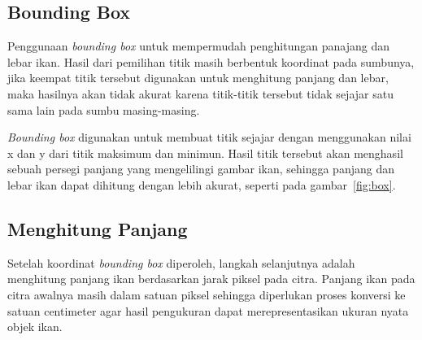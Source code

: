 
\subsection{Bounding Box}
    Penggunaan \emph{bounding box} untuk mempermudah penghitungan panajang dan lebar ikan. Hasil dari pemilihan titik masih berbentuk koordinat pada sumbunya, 
jika keempat titik tersebut digunakan untuk menghitung panjang dan lebar, maka hasilnya akan tidak akurat karena titik-titik tersebut tidak sejajar satu sama lain pada sumbu masing-masing.

    \emph{Bounding box} digunakan untuk membuat titik  sejajar dengan menggunakan nilai x dan y dari titik maksimum dan minimun. Hasil titik tersebut akan menghasil sebuah persegi panjang yang mengelilingi gambar ikan, 
sehingga panjang dan lebar ikan dapat dihitung dengan lebih akurat, seperti pada gambar~\ref{fig:box}.

\subsection{Menghitung Panjang}
Setelah koordinat \emph{bounding box} diperoleh, langkah selanjutnya adalah menghitung panjang ikan berdasarkan jarak piksel pada citra. 
Panjang ikan pada citra awalnya masih dalam satuan piksel sehingga diperlukan proses konversi ke satuan centimeter agar hasil pengukuran dapat merepresentasikan ukuran nyata objek ikan.


